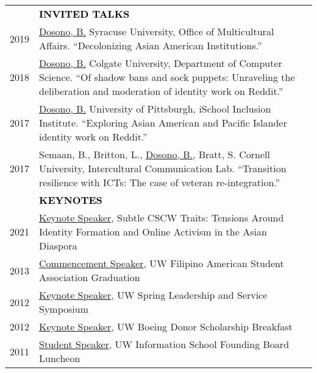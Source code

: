 \documentclass[11pt]{article}
\begin{document}
{{\begin{longtable}{Rp{0.75in}p{5.0in}}
& \textcolor{black}{\uppercase{\textbf{Invited Talks}}}\\

\footnotesize{2019} & \href{https://news.syr.edu/blog/2019/03/22/celebrate-asian-american-and-pacific-islander-heritage-month-this-april/}{Dosono, B.} Syracuse University, Office of Multicultural Affairs. ``Decolonizing Asian American Institutions.''\\

\footnotesize{2018} & \href{https://cs.colgate.edu/cs/events/151/}{Dosono, B.} Colgate University, Department of Computer Science. ``Of shadow bans and sock puppets: Unraveling the deliberation and moderation of identity work on Reddit.''\\

\footnotesize{2017} & \href{http://www.sis.pitt.edu/i3/i3-cohorts/2017/schedule.html}{Dosono, B.} University of Pittsburgh, iSchool Inclusion Institute. ``Exploring Asian American and Pacific Islander identity work on Reddit.''\\

\footnotesize{2017} & Semaan, B., Britton, L., \href{http://bit.ly/CornellTalk}{Dosono, B.}, Bratt, S. Cornell University, Intercultural Communication Lab. ``Transition resilience with ICTs: The case of veteran re-integration.''\\

& \textcolor{black}{\uppercase{\textbf{Keynotes}}}\\

\footnotesize{2021} & \href{https://bit.ly/subtlecscwtraits}{Keynote Speaker}, Subtle CSCW Traits: Tensions Around Identity Formation and Online Activism in the Asian Diaspora\\

\footnotesize{2013} & \href{https://youtu.be/uz1tukrR-7E}{Commencement Speaker}, UW Filipino American Student Association Graduation\\

\footnotesize{2012} & \href{https://youtu.be/WMPhe6H7yiM}{Keynote Speaker}, UW Spring Leadership and Service Symposium\\

\footnotesize{2012} & \href{https://ischool.uw.edu/news/2016/12/bryan-dosono-informatics-student-speaks-boeing-scholarship-breakfast}{Keynote Speaker}, UW Boeing Donor Scholarship Breakfast\\

\footnotesize{2011} & \href{https://ischool.uw.edu/about/leadership/founding-board}{Student Speaker}, UW Information School Founding Board Luncheon\\


\end{longtable}}}
\end{document}
